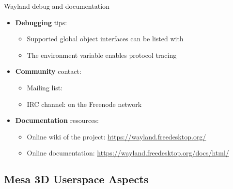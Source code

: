 \begin{frame}[fragile]{Wayland debug and documentation}
  \begin{itemize}
  \item \textbf{Debugging} tips:
    \begin{itemize}
    \item Supported global object interfaces can be listed with 
    \item The  environment variable enables protocol tracing
    \end{itemize}
  \item \textbf{Community} contact:
    \begin{itemize}
    \item Mailing list: 
    \item IRC channel:  on the Freenode network
    \end{itemize}
  \item \textbf{Documentation} resources:
    \begin{itemize}
    \item Online wiki of the project: \url{https://wayland.freedesktop.org/}
    \item Online documentation: \url{https://wayland.freedesktop.org/docs/html/}
    \end{itemize}
  \end{itemize}
\end{frame}

\subsection{Mesa 3D Userspace Aspects}

